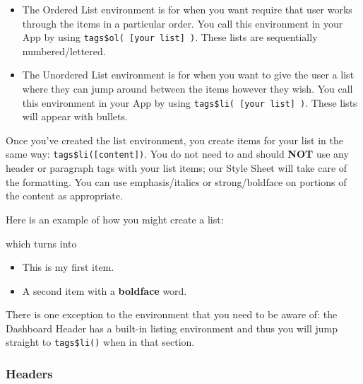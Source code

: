 \documentclass[
]{book}
\newenvironment{Shaded}{\begin{snugshade}}{\end{snugshade}}
\newcommand{\KeywordTok}[1]{\textcolor[rgb]{0.13,0.29,0.53}{\textbf{#1}}}
\newcommand{\NormalTok}[1]{#1}
\newcommand{\OperatorTok}[1]{\textcolor[rgb]{0.81,0.36,0.00}{\textbf{#1}}}
\newcommand{\StringTok}[1]{\textcolor[rgb]{0.31,0.60,0.02}{#1}}
\providecommand{\tightlist}{%
  \setlength{\itemsep}{0pt}\setlength{\parskip}{0pt}}
\begin{document}
\begin{itemize}
\tightlist
\item
  The Ordered List environment is for when you want require that user works through the items in a particular order. You call this environment in your App by using \texttt{tags\$ol(\ {[}your\ list{]}\ )}. These lists are sequentially numbered/lettered.
\item
  The Unordered List environment is for when you want to give the user a list where they can jump around between the items however they wish. You call this environment in your App by using \texttt{tags\$li(\ {[}your\ list{]}\ )}. These lists will appear with bullets.
\end{itemize}

Once you've created the list environment, you create items for your list in the same way: \texttt{tags\$li({[}content{]})}. You do not need to and should \textbf{NOT} use any header or paragraph tags with your list items; our Style Sheet will take care of the formatting. You can use emphasis/italics or strong/boldface on portions of the content as appropriate.

Here is an example of how you might create a list:

\begin{Shaded}
\end{Shaded}

which turns into

\begin{itemize}
\tightlist
\item
  This is my first item.
\item
  A second item with a \textbf{boldface} word.
\end{itemize}

There is one exception to the environment that you need to be aware of: the Dashboard Header has a built-in listing environment and thus you will jump straight to \texttt{tags\$li()} when in that section.

\hypertarget{headers}{%
\subsubsection{Headers}\label{headers}}
\end{document}
